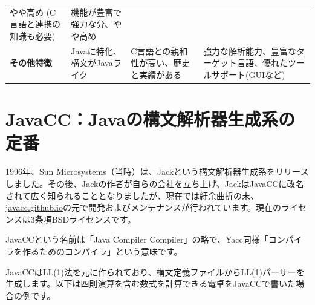 \begin{longtable}[]{@{}llll@{}}
\begin{minipage}[t]{0.22\columnwidth}
やや高め (C言語と連携の知識も必要)\strut
\end{minipage} & \begin{minipage}[t]{0.32\columnwidth}\raggedright
機能が豊富で強力な分、やや高め\strut
\end{minipage}\tabularnewline
\begin{minipage}[t]{0.14\columnwidth}\raggedright
\textbf{その他特徴}\strut
\end{minipage} & \begin{minipage}[t]{0.20\columnwidth}\raggedright
Javaに特化、構文がJavaライク\strut
\end{minipage} & \begin{minipage}[t]{0.22\columnwidth}\raggedright
C言語との親和性が高い、歴史と実績がある\strut
\end{minipage} & \begin{minipage}[t]{0.32\columnwidth}\raggedright
強力な解析能力、豊富なターゲット言語、優れたツールサポート(GUIなど)\strut
\end{minipage}\tabularnewline
\bottomrule
\end{longtable}

\hypertarget{chapter6-javaccjavaux306eux69cbux6587ux89e3ux6790ux5668ux751fux6210ux7cfbux306eux5b9aux756a}{%
\section{JavaCC：Javaの構文解析器生成系の定番}\label{chapter6-javaccjavaux306eux69cbux6587ux89e3ux6790ux5668ux751fux6210ux7cfbux306eux5b9aux756a}}

1996年、Sun
Microsystems（当時）は、Jackという構文解析器生成系をリリースしました。その後、Jackの作者が自らの会社を立ち上げ、JackはJavaCCに改名されて広く知られることとなりましたが、現在では紆余曲折の末、\href{https://javacc.github.io/javacc}{javacc.github.io}の元で開発およびメンテナンスが行われています。現在のライセンスは3条項BSDライセンスです。

JavaCCという名前は「Java Compiler
Compiler」の略で、Yacc同様「コンパイラを作るためのコンパイラ」という意味です。

JavaCCはLL(1)法を元に作られており、構文定義ファイルからLL(1)パーサーを生成します。以下は四則演算を含む数式を計算できる電卓をJavaCCで書いた場合の例です。


